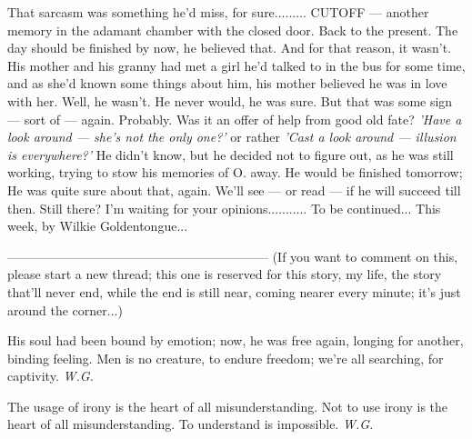That sarcasm was something he'd miss, for sure.........
CUTOFF --- another memory in the adamant chamber with the closed door. 
Back to the present. 
The day should be finished by now, he believed that. 
And for that reason, it wasn't. 
His mother and his granny had met a girl he'd talked to in the bus for some time, and as she'd known some things about him, his mother believed he was in love with her. 
Well, he wasn't. 
He never would, he was sure. 
But that was some sign --- sort of --- again. 
Probably. 
Was it an offer of help from good old fate?
\emph{'Have a look around --- she's not the only one?'}
    or rather
\emph{'Cast a look around --- illusion is everywhere?'}
He didn't know, but he decided not to figure out, as he was still working, trying to stow his memories of O. away. 
He would be finished tomorrow; He was quite sure about that, again. 
We'll see --- or read --- if he will succeed till then. 
Still there? I'm waiting for your opinions...........
To be continued...
This week, by Wilkie Goldentongue...

--------------------------------------------------------------
(If you want to comment on this, please start a new thread; this one is reserved for this story, my life, the story that'll never end, while the end is still near, coming nearer every minute; it's just around the corner...)

His soul had been bound by emotion;
now, he was free again,
longing for another,
binding feeling. 
Men is no creature,
to endure freedom;
we're all searching,
for captivity. 
\emph{W.G.}

The usage of irony
is the heart of all misunderstanding. 
Not to use irony
is the heart of all misunderstanding. 
To understand is impossible. 
\emph{W.G.}

